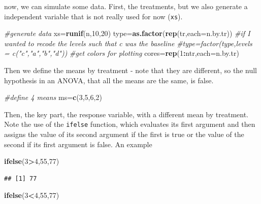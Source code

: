 \documentclass[
]{book}
\newenvironment{Shaded}{\begin{snugshade}}{\end{snugshade}}
\newcommand{\CommentTok}[1]{\textcolor[rgb]{0.56,0.35,0.01}{\textit{#1}}}
\newcommand{\DataTypeTok}[1]{\textcolor[rgb]{0.13,0.29,0.53}{#1}}
\newcommand{\DecValTok}[1]{\textcolor[rgb]{0.00,0.00,0.81}{#1}}
\newcommand{\KeywordTok}[1]{\textcolor[rgb]{0.13,0.29,0.53}{\textbf{#1}}}
\newcommand{\NormalTok}[1]{#1}
\newcommand{\OperatorTok}[1]{\textcolor[rgb]{0.81,0.36,0.00}{\textbf{#1}}}
\begin{document}
now, we can simulate some data. First, the treatments, but we also generate a independent variable that is not really used for now (\texttt{xs}).

\begin{Shaded}
\begin{Highlighting}[]
\CommentTok{#generate data}
\NormalTok{xs=}\KeywordTok{runif}\NormalTok{(n,}\DecValTok{10}\NormalTok{,}\DecValTok{20}\NormalTok{)}
\NormalTok{type=}\KeywordTok{as.factor}\NormalTok{(}\KeywordTok{rep}\NormalTok{(tr,}\DataTypeTok{each=}\NormalTok{n.by.tr))}
\CommentTok{#if I wanted to recode the levels such that c was the baseline}
\CommentTok{#type=factor(type,levels = c("c","a","b","d"))}
\CommentTok{#get colors for plotting}
\NormalTok{cores=}\KeywordTok{rep}\NormalTok{(}\DecValTok{1}\OperatorTok{:}\NormalTok{ntr,}\DataTypeTok{each=}\NormalTok{n.by.tr)}
\end{Highlighting}
\end{Shaded}

Then we define the means by treatment - note that they are different, so the null hypothesis in an ANOVA, that all the means are the same, is false.

\begin{Shaded}
\begin{Highlighting}[]
\CommentTok{#define 4 means}
\NormalTok{ms=}\KeywordTok{c}\NormalTok{(}\DecValTok{3}\NormalTok{,}\DecValTok{5}\NormalTok{,}\DecValTok{6}\NormalTok{,}\DecValTok{2}\NormalTok{)}
\end{Highlighting}
\end{Shaded}

Then, the key part, the response variable, with a different mean by treatment. Note the use of the \texttt{ifelse} function, which evaluates its first argument and then assigns the value of its second argument if the first is true or the value of the second if its first argument is false. An example

\begin{Shaded}
\begin{Highlighting}[]
\KeywordTok{ifelse}\NormalTok{(}\DecValTok{3}\OperatorTok{>}\DecValTok{4}\NormalTok{,}\DecValTok{55}\NormalTok{,}\DecValTok{77}\NormalTok{)}
\end{Highlighting}
\end{Shaded}

\begin{verbatim}
## [1] 77
\end{verbatim}

\begin{Shaded}
\begin{Highlighting}[]
\KeywordTok{ifelse}\NormalTok{(}\DecValTok{3}\OperatorTok{<}\DecValTok{4}\NormalTok{,}\DecValTok{55}\NormalTok{,}\DecValTok{77}\NormalTok{)}
\end{Highlighting}
\end{Shaded}
\end{document}
